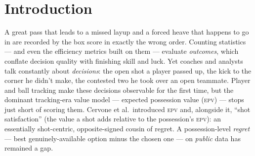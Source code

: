 \documentclass[11pt]{article}
\newcommand{\plot}{\textsc{plot}}
\newcommand{\epv}{\textsc{epv}}
\begin{document}
\begin{abstract}
man'' read is \emph{not} recoverable from public tracking --- whether because the open man is open
precisely \emph{because} he is not a threat, or because the teammate counterfactual is simply too crude
to score, the read is not one this data can credit. Both validations are at the \emph{decision} level; an out-of-sample cross-fit finds only \emph{weak, fragile}
support for clean attribution to individual \emph{players} (pooled within-role $r\!\approx\!0.11$,
heavily attenuated from an in-sample $0.33$, with one of two folds individually null), so we keep the
validated claim at the decision level and report player-level attribution as modest at best. A variance decomposition shows the between-player signal is majority within-role
decision quality ($52\%$) rather than role-of-touch ($29\%$), and the within-role component is itself
reliable and robust to the strength of the role control. We release the value layer, the metric, a
chess.com-style possession-review demo, and all gate code. We are explicit about scope: \plot{}
measures genuinely-left value \emph{conditional on observables}, not proven-causal ``decision IQ,'' and
the validated claim is narrow, modest in magnitude, and honest about selection on unobservables.
\end{abstract}

\section{Introduction}
A great pass that leads to a missed layup and a forced heave that happens to go in are recorded by the
box score in exactly the wrong order. Counting statistics --- and even the efficiency metrics built on
them --- evaluate \emph{outcomes}, which conflate decision quality with finishing skill and luck. Yet
coaches and analysts talk constantly about \emph{decisions}: the open shot a player passed up, the kick
to the corner he didn't make, the contested two he took over an open teammate. Player and ball tracking
make these decisions observable for the first time, but the dominant tracking-era value model ---
expected possession value (\epv{}) \citep{cervone2016multiresolution,cervone2014pointwise} --- stops
just short of scoring them. Cervone et al.\ introduced \epv{} and, alongside it, ``shot satisfaction''
(the value a shot adds relative to the possession's \epv{}): an essentially shot-centric, opposite-signed
cousin of regret. A possession-level \emph{regret} --- best genuinely-available option minus the chosen
one --- on \emph{public} data has remained a gap.
\end{document}

